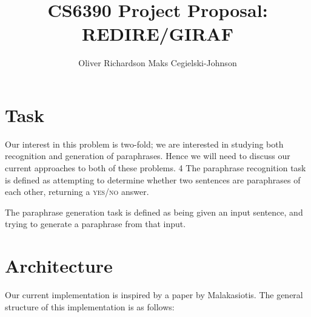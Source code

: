 \documentclass[11pt, reqno]{amsart}
\newcommand{\mala}{Malakasiotis}
\begin{document}
	\title{\LARGE CS6390 Project Proposal: REDIRE/GIRAF}
	\author{\textsc Oliver Richardson \hspace{2em} Maks Cegielski-Johnson }
	\maketitle 
	
	\vspace{-2em}
	
	\section{Task}

	Our interest in this problem is two-fold; we are interested in studying both recognition and generation of paraphrases. Hence we will need to discuss our current approaches to both of these problems. 
4	
	The paraphrase recognition task is defined as attempting to determine whether two sentences are paraphrases of each other, returning a \textsc{yes/no} answer.
	
	The paraphrase generation task is defined as being given an input sentence, and trying to generate a paraphrase from that input. %
	

	
	\section{Architecture}
	Our current implementation is inspired by a paper by \mala \cite{malakasiotis2009paraphrase}. The general structure of this implementation is as follows:
	
\end{document}
